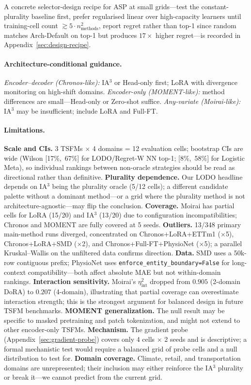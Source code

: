 \documentclass{article}
\begin{document}
A concrete selector-design recipe for ASP at small grids---test the constant-plurality baseline first, prefer regularised linear over high-capacity learners until training-cell count $\gtrsim 5 \cdot n_{\text{methods}}^2$, report regret rather than top-1 since random matches Arch-Default on top-1 but produces $17\times$ higher regret---is recorded in Appendix~\ref{sec:design-recipe}.

\paragraph{Architecture-conditional guidance.}
\textit{Encoder--decoder (Chronos-like):} IA$^3$ or Head-only first; LoRA with divergence monitoring on high-shift domains. \textit{Encoder-only (MOMENT-like):} method differences are small---Head-only or Zero-shot suffice. \textit{Any-variate (Moirai-like):} IA$^3$ may be insufficient; include LoRA and Full-FT.

\paragraph{Limitations.}
\label{sec:limitations}
\textbf{Scale and CIs.} 3 TSFMs $\times$ 4 domains = 12 evaluation cells; bootstrap CIs are wide (Wilson [17\%,~67\%] for LODO/Regret-W NN top-1; [8\%,~58\%] for Logistic Meta), so individual rankings between non-oracle strategies should be read as directional rather than definitive. \textbf{Plurality dependence.} Our LODO headline depends on IA$^3$ being the plurality oracle (5/12 cells); a different candidate palette without a dominant method---or a grid where the plurality method is not architecture-agnostic---may flip the conclusion. \textbf{Coverage.} Moirai has partial cells for LoRA (15/20) and IA$^3$ (13/20) due to configuration incompatibilities; Chronos and MOMENT are fully covered at 5 seeds. \textbf{Outliers.} 13/348 primary main-method runs diverged, concentrated on Chronos+LoRA+ETTm1 ($\times$5), Chronos+LoRA+SMD ($\times$2), and Chronos+Full-FT+PhysioNet ($\times$5); a parallel Kruskal--Wallis on the unfiltered data confirms direction. \textbf{Data.} SMD uses a 50k-row contiguous prefix; PhysioNet uses \texttt{enforce\_entity\_boundary=False} for long-context compatibility---both affect absolute MAE but not within-domain rankings. \textbf{Interaction sensitivity.} Moirai's $\eta^2_{\text{int}}$ dropped from $0.905$ (2-domain DoRA) to $0.207$ (4-domain), illustrating that partial coverage can overestimate interaction strength; this is the strongest argument for balanced design in future TSFM benchmarks. \textbf{MOMENT generalization.} The null result may be specific to masked pretraining and patch tokenization, and might not extend to other encoder-only TSFMs. \textbf{Mechanism.} The gradient probe (Appendix~\ref{sec:gradient-probe}) covers only 4 cells $\times$ 2 seeds and is descriptive; a formal mechanistic test would require a balanced grid of probe cells and a null distribution to test for. \textbf{Domain coverage.} Climate, retail, and transportation domains are unrepresented; their inclusion may either reinforce the IA$^3$ plurality or break it---we cannot predict from the current grid.
\end{document}
